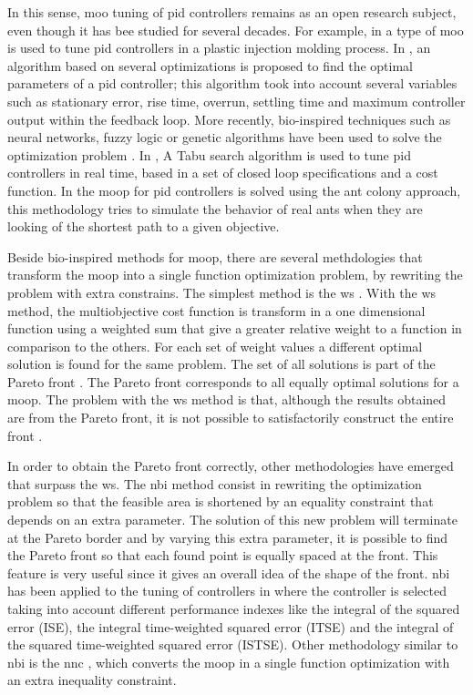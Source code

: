 \begin{refsection}
In this sense, \gls{moo} tuning of \gls{pid} controllers remains as an open research subject, even though it has bee studied for several decades. For example, in \parencite{Seaman1994} a type of \gls{moo} is used to tune \gls{pid} controllers in a plastic injection molding process. In \parencite{Abbas1995}, an algorithm based on several optimizations is proposed to find the optimal parameters of a \gls{pid} controller; this algorithm took into account several variables such as stationary error, rise time, overrun, settling time and maximum controller output within the feedback loop. More recently, bio-inspired techniques such as neural networks, fuzzy logic or genetic algorithms have been used to solve the optimization problem \parencite{Reynoso-Meza2012b}. In \parencite{Bagis2011}, A Tabu search algorithm is used to tune \gls{pid} controllers in real time, based in a set of closed loop specifications and a cost function. In \parencite{Chiha2012} the \gls{moop} for \gls{pid} controllers is solved using the ant colony approach, this methodology tries to simulate the behavior of real ants when they are looking of the shortest path to a given objective.

Beside bio-inspired methods for \gls{moop}, there are several methdologies that transform the \gls{moop} into a single function optimization problem, by rewriting the problem with extra constrains. The simplest method is the \gls{ws} \parencite{Marler2004}. With the \gls{ws} method, the multiobjective cost function is transform in a one dimensional function using a weighted sum that give a greater relative weight to a function in comparison to the others. For each set of weight values a different optimal solution is found for the same problem. The set of all solutions is part of the Pareto front \parencite{Marler2004}. The Pareto front corresponds to all equally optimal solutions for a \gls{moop}. The problem with the \gls{ws} method is that, although the results obtained are from the Pareto front, it is not possible to satisfactorily construct the entire front \parencite{Das1997,Messac2000,Marler2010}.

In order to obtain the Pareto front correctly, other methodologies have emerged that surpass the \gls{ws}. The \gls{nbi} method \parencite{Das1998} consist in rewriting the optimization problem so that the feasible area is shortened by an equality constraint that depends on an extra parameter. The solution of this new problem will terminate at the Pareto border and by varying this extra parameter, it is possible to find the Pareto front so that each found point is equally spaced at the front. This feature is very useful since it gives an overall idea of the shape of the front. \gls{nbi} has been applied to the tuning of controllers in \parencite{Gambier2009} where the controller is selected taking into account different performance indexes like the integral of the squared error (ISE), the integral time-weighted squared error (ITSE) and the integral of the squared time-weighted squared error (ISTSE). Other methodology similar to \gls{nbi} is the \gls{nnc} \parencite{Messac2003}, which converts the \gls{moop} in a single function optimization with an extra inequality constraint.


\end{refsection}
